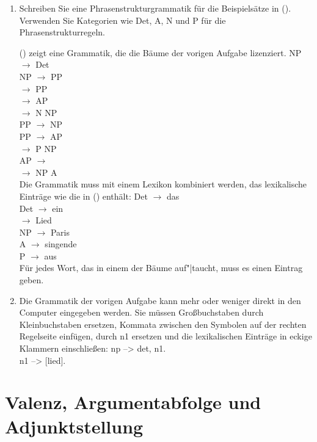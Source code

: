 \begin{enumerate}
\item Schreiben Sie eine Phrasenstrukturgrammatik für die Beispielsätze in (). Verwenden Sie
  Kategorien wie Det, A, N und P für die Phrasenstrukturregeln.

() zeigt eine Grammatik, die die Bäume der vorigen Aufgabe lizenziert.
\ea
NP $\to$ Det \nbar\\
NP $\to$ \nbar PP\\
\nbar $\to$ \nbar PP\\
\nbar $\to$ AP \nbar\\
\nbar $\to$ N NP\\
%
PP $\to$ NP \pbar\\
PP $\to$ AP \pbar\\
\pbar $\to$ P NP\\
%
AP $\to$ \abar\\
\abar $\to$ NP A\\
%
\z
Die Grammatik muss mit einem Lexikon kombiniert werden, das lexikalische Einträge wie die in () enthält:
\ea
Det $\to$ das\\
Det $\to$ ein\\
\nbar $\to$ Lied\\
NP $\to$ Paris\\
A $\to$ singende\\
P $\to$ aus\\
\z
Für jedes Wort, das in einem der Bäume auf"|taucht, muss es einen Eintrag geben.
\item Die Grammatik der vorigen Aufgabe kann mehr oder weniger direkt in den Computer eingegeben
  werden. Sie müssen Großbuchstaben durch Kleinbuchstaben ersetzen, Kommata zwischen den Symbolen auf
  der rechten Regelseite einfügen, \nbar durch n1 ersetzen und die lexikalischen Einträge in eckige
  Klammern einschließen:
\ea
np --> det, n1.\\
n1 --> [lied].\\
\z
\end{enumerate}
\clearpage

\section{Valenz, Argumentabfolge und Adjunktstellung}

